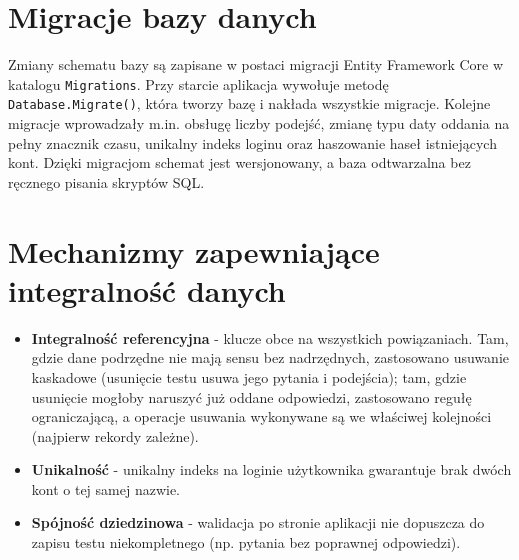 \section{Migracje bazy danych}
\label{sec:migracje}

Zmiany schematu bazy są zapisane w postaci migracji Entity Framework Core w katalogu
\texttt{Migrations}. Przy starcie aplikacja wywołuje metodę \texttt{Database.Migrate()}, która tworzy
bazę i nakłada wszystkie migracje. Kolejne migracje wprowadzały m.in. obsługę liczby podejść, zmianę
typu daty oddania na pełny znacznik czasu, unikalny indeks loginu oraz haszowanie haseł istniejących
kont. Dzięki migracjom schemat jest wersjonowany, a baza odtwarzalna bez ręcznego pisania skryptów SQL.

\section{Mechanizmy zapewniające integralność danych}
\label{sec:integralnosc}

\begin{itemize}
  \item \textbf{Integralność referencyjna} - klucze obce na wszystkich powiązaniach. Tam, gdzie dane
        podrzędne nie mają sensu bez nadrzędnych, zastosowano usuwanie kaskadowe (usunięcie testu
        usuwa jego pytania i podejścia); tam, gdzie usunięcie mogłoby naruszyć już oddane odpowiedzi,
        zastosowano regułę ograniczającą, a operacje usuwania wykonywane są we właściwej kolejności
        (najpierw rekordy zależne).
  \item \textbf{Unikalność} - unikalny indeks na loginie użytkownika gwarantuje brak dwóch kont o tej
        samej nazwie.
  \item \textbf{Spójność dziedzinowa} - walidacja po stronie aplikacji nie dopuszcza do zapisu testu
        niekompletnego (np. pytania bez poprawnej odpowiedzi).
\end{itemize}
